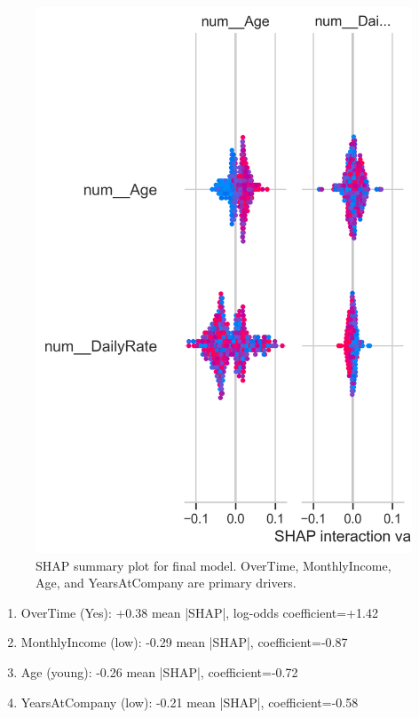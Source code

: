\documentclass[conference]{IEEEtran}
\begin{document}
\begin{figure}[!t]
  \centering
  \includegraphics[width=\linewidth]{shap_final_improved.png}
  \caption{SHAP summary plot for final model. OverTime, MonthlyIncome, Age, and YearsAtCompany are primary drivers.}
  \label{fig:shap_final}
\end{figure}

\begin{enumerate}
    \item OverTime (Yes): +0.38 mean |SHAP|, log-odds coefficient=+1.42
    \item MonthlyIncome (low): -0.29 mean |SHAP|, coefficient=-0.87
    \item Age (young): -0.26 mean |SHAP|, coefficient=-0.72
    \item YearsAtCompany (low): -0.21 mean |SHAP|, coefficient=-0.58
\end{enumerate}
\end{document}
